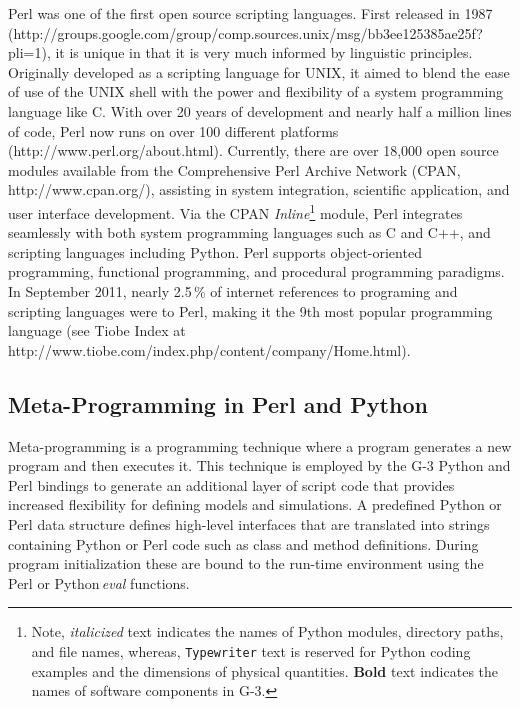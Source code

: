 \documentclass[10pt]{article}
\begin{document}
Perl was one of the first open source scripting languages. First
released in 1987
(http://groups.google.com/group/comp.sources.unix/msg/bb3ee125385ae25f?pli=1),
it is unique in that it is very much informed by linguistic
principles.  Originally developed as a scripting language for UNIX, it
aimed to blend the ease of use of the UNIX shell with the power and
flexibility of a system programming language like C.  With over 20
years of development and nearly half a million lines of code, Perl now
runs on over 100 different platforms (http://www.perl.org/about.html).  Currently, there are over 18,000
open source modules available from the Comprehensive Perl Archive
Network (CPAN, http://www.cpan.org/), assisting in system integration, scientific
application, and user interface development.  Via the CPAN {\it Inline}\footnote{Note, {\it italicized} text indicates the names of Python modules, directory paths, and file names, whereas, {\tt Typewriter} text is reserved for Python coding examples and the dimensions of physical quantities. {\bf Bold} text indicates the names of software components in G-3.}
module, Perl integrates seamlessly with both system programming
languages such as C and C++, and scripting languages including Python.
Perl supports object-oriented programming, functional programming, and
procedural programming paradigms. In September 2011, nearly
2.5\,\% of internet references to programing and scripting languages were to Perl, making
it the 9th most popular programming
language (see Tiobe Index at http://www.tiobe.com/index.php/content/company/Home.html).

\subsection*{Meta-Programming in Perl and Python}

Meta-programming is a programming technique where a program generates
a new program and then executes it.  This technique is employed by
the G-3 Python and Perl bindings to generate an
additional layer of script code that provides increased flexibility
for defining models and simulations.  A predefined Python  or
Perl data structure defines high-level interfaces that are translated
into strings containing Python or Perl code such as class and method
definitions.  During program initialization these are bound to the run-time
environment using the Perl or Python\,{\it eval} functions.
\end{document}
